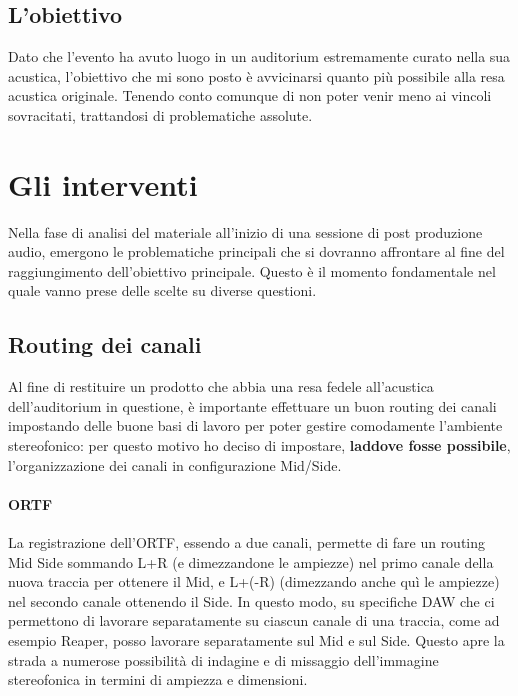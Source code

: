 
\newpage
	
	\subsection{L'obiettivo}
	Dato che l'evento ha avuto luogo in un auditorium estremamente curato nella sua acustica, l'obiettivo che mi sono posto è avvicinarsi quanto più possibile alla resa acustica originale. Tenendo conto comunque di non poter venir meno ai vincoli sovracitati, trattandosi di problematiche assolute.
	
\section{Gli interventi}
Nella fase di analisi del materiale all'inizio di una sessione di post produzione audio, emergono le problematiche principali che si dovranno affrontare al fine del raggiungimento dell'obiettivo principale. Questo è il momento fondamentale nel quale vanno prese delle scelte su diverse questioni.

	\subsection{Routing dei canali}
	Al fine di restituire un prodotto che abbia una resa fedele all'acustica dell'auditorium in questione, è importante effettuare un buon routing dei canali impostando delle buone basi di lavoro per poter gestire comodamente l'ambiente stereofonico: per questo motivo ho deciso di impostare, \textbf{laddove fosse possibile}, l'organizzazione dei canali in configurazione Mid/Side.
	
		\paragraph{ORTF} La registrazione dell'ORTF, essendo a due canali, permette di fare un routing Mid Side sommando L+R (e dimezzandone le ampiezze) nel primo canale della nuova traccia per ottenere il Mid, e L+(-R) (dimezzando anche quì le ampiezze) nel secondo canale ottenendo il Side.
		In questo modo, su specifiche DAW che ci permettono di lavorare separatamente su ciascun canale di una traccia, come ad esempio Reaper, posso lavorare separatamente sul Mid e sul Side. Questo apre la strada a numerose possibilità di indagine e di missaggio dell'immagine stereofonica in termini di ampiezza e dimensioni.
		
